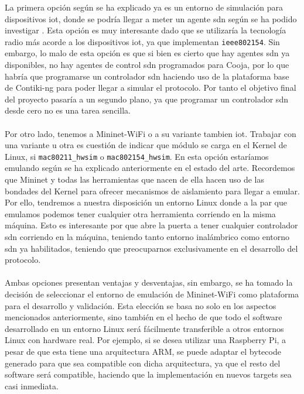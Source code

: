 La primera opción según se ha explicado ya es un entorno de simulación para dispositivos \gls{iot}, donde se podría llegar a meter un agente \gls{sdn} según se ha podido investigar \cite{baddeley2018evolving, Anadiotis:2019}. Esta opción es muy interesante dado que se utilizaría la tecnología radio más acorde a los dispositivos \gls{iot}, ya que implementan \texttt{ieee802154}. Sin embargo, lo malo de esta opción es que si bien es cierto que hay agentes \gls{sdn} ya disponibles, no hay agentes de control \gls{sdn} programados para Cooja, por lo que habría que programarse un controlador \gls{sdn} haciendo uso de la plataforma base de Contiki-ng para poder llegar a simular el protocolo. Por tanto el objetivo final del proyecto pasaría a un segundo plano, ya que programar un controlador \gls{sdn} desde cero no es una tarea sencilla.\\
\\
Por otro lado, tenemos a Mininet-WiFi o a su variante tambien \gls{iot}. Trabajar con una variante u otra es cuestión de indicar que módulo se carga en el Kernel de Linux, si \texttt{mac80211\_hwsim} o \texttt{mac802154\_hwsim}. En esta opción estaríamos emulando según se ha explicado anteriormente en el estado del arte. Recordemos que Mininet y todas las herramientas que nacen de ella hacen uso de las bondades del Kernel para ofrecer mecanismos de aislamiento para llegar a emular. Por ello, tendremos a nuestra disposición un entorno Linux donde a la par que emulamos podemos tener cualquier otra herramienta corriendo en la misma máquina. Esto es interesante por que abre la puerta a tener cualquier controlador \gls{sdn} corriendo en la máquina, teniendo tanto entorno inalámbrico como entorno \gls{sdn} ya habilitados, teniendo que preocuparnos exclusivamente en el desarrollo del protocolo.\\
\\
Ambas opciones presentan ventajas y desventajas, sin embargo, se ha tomado la decisión de seleccionar el entorno de emulación de Mininet-WiFi como plataforma para el desarrollo y validación. Esta elección se basa no solo en los aspectos mencionados anteriormente, sino también en el hecho de que todo el software desarrollado en un entorno Linux será fácilmente transferible a otros entornos Linux con hardware real. Por ejemplo, si se desea utilizar una Raspberry Pi, a pesar de que esta tiene una arquitectura ARM, se puede adaptar el bytecode generado para que sea compatible con dicha arquitectura, ya que el resto del software será compatible, haciendo que la implementación en nuevos targets sea casi inmediata.